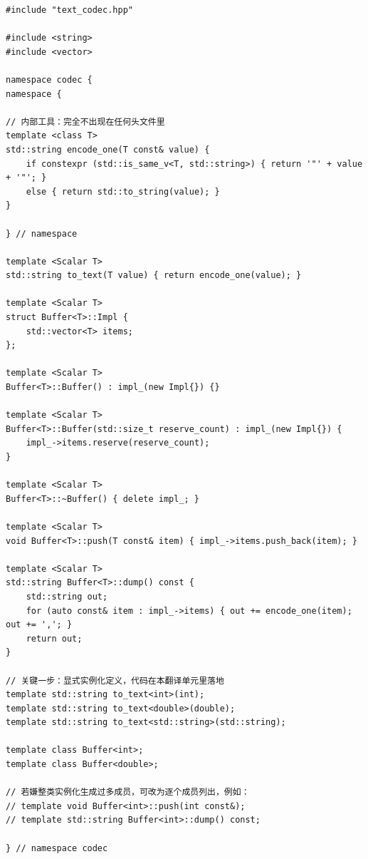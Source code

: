 \documentclass[12pt,a4paper,fontset=fandol]{ctexbook}
\begin{document}
\begin{lstlisting}[style=cppstyle,caption={text\_codec.cpp —— 实现与显式实例化定义只在这里}]
#include "text_codec.hpp"

#include <string>
#include <vector>

namespace codec {
namespace {

// 内部工具：完全不出现在任何头文件里
template <class T>
std::string encode_one(T const& value) {
    if constexpr (std::is_same_v<T, std::string>) { return '"' + value + '"'; }
    else { return std::to_string(value); }
}

} // namespace

template <Scalar T>
std::string to_text(T value) { return encode_one(value); }

template <Scalar T>
struct Buffer<T>::Impl {
    std::vector<T> items;
};

template <Scalar T>
Buffer<T>::Buffer() : impl_(new Impl{}) {}

template <Scalar T>
Buffer<T>::Buffer(std::size_t reserve_count) : impl_(new Impl{}) {
    impl_->items.reserve(reserve_count);
}

template <Scalar T>
Buffer<T>::~Buffer() { delete impl_; }

template <Scalar T>
void Buffer<T>::push(T const& item) { impl_->items.push_back(item); }

template <Scalar T>
std::string Buffer<T>::dump() const {
    std::string out;
    for (auto const& item : impl_->items) { out += encode_one(item); out += ','; }
    return out;
}

// 关键一步：显式实例化定义，代码在本翻译单元里落地
template std::string to_text<int>(int);
template std::string to_text<double>(double);
template std::string to_text<std::string>(std::string);

template class Buffer<int>;
template class Buffer<double>;

// 若嫌整类实例化生成过多成员，可改为逐个成员列出，例如：
// template void Buffer<int>::push(int const&);
// template std::string Buffer<int>::dump() const;

} // namespace codec
\end{lstlisting}
\end{document}

